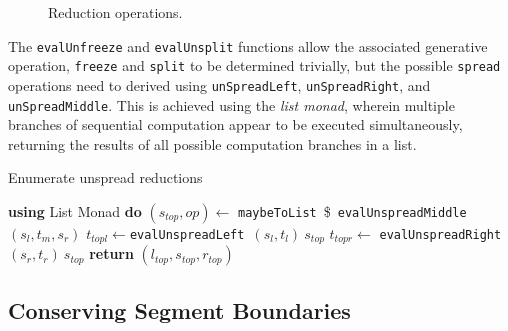 \documentclass[12pt,a4paper,twoside,openany]{report} \usepackage[pdfborder={0 0 0}]{hyperref}    %
\theoremstyle{definition} \newtheorem{definition}{Definition}[section]
\begin{document}
\begin{figure}[ht]
  \captionsetup{width=.9\linewidth} \caption{Reduction operations.} \label{fig:evalOps} \end{figure}

  The \texttt{evalUnfreeze} and \texttt{evalUnsplit} functions allow the associated generative operation,
  \texttt{freeze} and \texttt{split} to be determined trivially, but the possible \texttt{spread} operations need to
  derived using \texttt{unSpreadLeft}, \texttt{unSpreadRight}, and \texttt{unSpreadMiddle}. This is achieved using the
  \textit{list monad}, wherein multiple branches of sequential computation appear to be executed simultaneously,
  returning the results of all possible computation branches in a list.

  \begin{algorithm}[ht] 
    \caption{Enumerate unspread reductions} 
    \label{code:heuristic0}
    \begin{algorithmic}[1] 
      \State \textbf{using} List Monad
      \textbf{do} 
        \State $(s_{top}, op) \gets$ \texttt{maybeToList}~\$~\texttt{evalUnspreadMiddle} $(s_l, t_m, s_r)$
        \State $t_{topl} \gets $\texttt{evalUnspreadLeft}~$(s_l, t_l)~s_{top}$ 
        \State $t_{topr} \gets$ \texttt{evalUnspreadRight}~$(s_r, t_r)~s_{top}$ 
        \State \textbf{return} $(l_{top}, s_{top}, r_{top}) $
      \EndFunction
    \end{algorithmic} 
  \end{algorithm}


%
%
%
%
%
%

  \subsection{Conserving Segment Boundaries}
  \label{sub:boundaryHandling}
\end{document}
